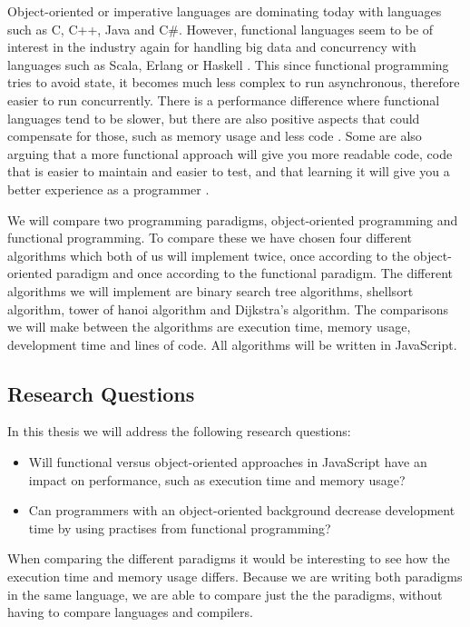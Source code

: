 \documentclass {article}
\begin{document}
Object-oriented or imperative languages are dominating today with languages such as C, C++, Java and C\#. However, functional languages seem to be of interest in the industry again for handling big data and concurrency with languages such as Scala, Erlang or Haskell \cite{drboolean, eriksen, erikarl}. This since functional programming tries to avoid state, it becomes much less complex to run asynchronous, therefore easier to run concurrently. There is a performance difference where functional languages tend to be slower, but there are also positive aspects that could compensate for those, such as memory usage and less code \cite{fogus, alomgi}.  Some are also arguing that a more functional approach will give you more readable code, code that is easier to maintain and easier to test, and that learning it will give you a better experience as a programmer \cite{drboolean, meijer}. 

We will compare two programming paradigms, object-oriented programming and functional programming. To compare these we have chosen four different algorithms which both of us will implement twice, once according to the object-oriented paradigm and once according to the functional paradigm. The different algorithms we will implement are binary search tree algorithms, shellsort algorithm, tower of hanoi algorithm and Dijkstra's algorithm. The comparisons we will make between the algorithms are execution time, memory usage, development time and lines of code. All algorithms will be written in JavaScript.
\subsection{Research Questions}
In this thesis we will address the following research questions:
\begin{itemize}
\item Will functional versus object-oriented approaches in JavaScript have an impact on performance, such as execution time and memory usage?
\item Can programmers with an object-oriented background decrease development time by using practises from functional programming?
\end{itemize}

When comparing the different paradigms it would be interesting to see how the execution time and memory usage differs. Because we are writing both paradigms in the same language, we are able to compare just the the paradigms, without having to compare languages and compilers.
\end{document}
